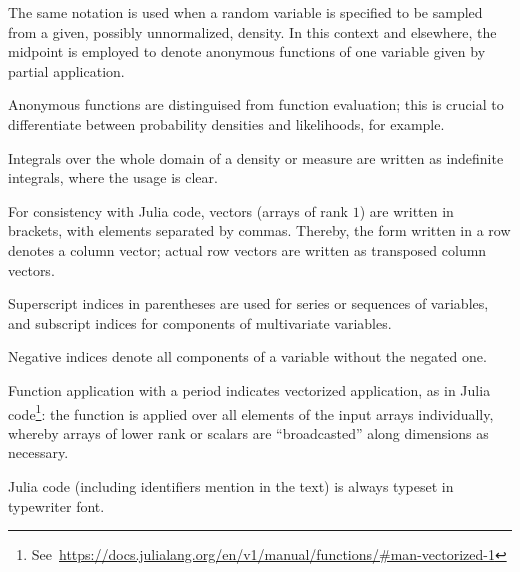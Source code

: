 \begin{symbolicfootnotes}
\begin{description}[style=nextline, leftmargin=4cm]
  \item[{\(Y \from q(\cdot, X_{i-1})\)}] The same notation is used when a random variable is specified
    to be sampled from a given, possibly unnormalized, density.  In this context and elsewhere, the
    midpoint is employed to denote anonymous functions of one variable given by partial application.
  \item[{\(y \mapsto \prob{x \given y, z}\)}] Anonymous functions are distinguised from function
    evaluation; this is crucial to differentiate between probability densities and likelihoods, for
    example.
  \item[\(\int \prob{x} \dif x = 1\)] Integrals over the whole domain of a density or measure are
    written as indefinite integrals, where the usage is clear.
  \item[{\([x, y, z] = \smash[b]{\left(\begin{smallmatrix}x\\y\\z\end{smallmatrix}\right)}\)}] For consistency
    with Julia code, vectors (arrays of rank \(1\)) are written in brackets, with elements separated
    by commas.  Thereby, the form written in a row denotes a column vector; actual row vectors are
    written as transposed column vectors.
  \item[{\(\kth{\Theta} = [\kth{\Theta}_1, \ldots, \kth{\Theta}_N]\)}] Superscript indices in
    parentheses are used for series or sequences of variables, and subscript indices for components of
    multivariate variables.
  \item[{\(z_{-i} = [z_{1}, \ldots, z_{i-1}, z_{i+1}, \ldots, z_{N}]\)}] Negative indices denote all
    components of a variable without the negated one.
  \item[{\(\broadcast{f}(x, 1) = [f(x_{1}, 1), \ldots, f(x_{N}, 1)]\)}] Function application with a
    period indicates vectorized application, as in Julia
    code\footnote{See~\protect\url{https://docs.julialang.org/en/v1/manual/functions/\#man-vectorized-1}}:
    the function is applied over all elements of the input arrays individually, whereby arrays of
    lower rank or scalars are \enquote{broadcasted} along dimensions as necessary.
  \item[{\jlinlfont f(x) = rand(x)}] Julia code (including identifiers mention in the text) is
    always typeset in typewriter font.
  \end{description}
\end{symbolicfootnotes}

